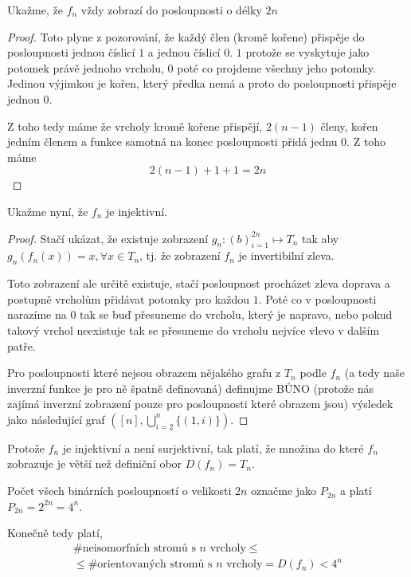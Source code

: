 \documentclass[../main.tex]{subfiles}
\begin{document}
Ukažme, že $f_n$ vždy zobrazí do posloupnosti o délky $2n$
\begin{proof}
    Toto plyne z pozorování, že každý člen (kromě kořene) přispěje do posloupnosti 
    jednou číslicí $1$ a jednou číslicí $0$. $1$ protože se vyskytuje jako potomek právě jednoho vrcholu, $0$ poté co projdeme všechny jeho potomky. 
    Jedinou výjimkou je kořen, který předka nemá a proto do posloupnosti přispěje jednou $0$.

    Z toho tedy máme že vrcholy kromě kořene přispějí, $2(n-1)$ členy, kořen jedním členem a funkce samotná na konec posloupnosti přidá jednu 0. Z toho máme \begin{equation*}
        2(n-1) + 1 + 1 = 2n 
    \end{equation*}
\end{proof}

Ukažme nyní, že $f_n$ je injektivní.

\begin{proof}
    Stačí ukázat, že existuje zobrazení $g_n: (b)_{i=1}^{2n} \mapsto T_n$ tak aby $g_n(f_n(x)) = x, \forall x \in T_n$, tj. že zobrazení $f_n$ je invertibilní zleva.

    Toto zobrazení ale určitě existuje, stačí posloupnost procházet zleva doprava a postupně vrcholům přidávat potomky 
    pro každou $1$. Poté co v posloupnosti narazíme na $0$ tak se buď přesuneme do vrcholu, který je napravo, 
    nebo pokud takový vrchol neexistuje tak se přesuneme do vrcholu nejvíce vlevo v dalším patře.

    Pro posloupnosti které nejsou obrazem nějakého grafu z $T_n$ podle $f_n$ (a tedy naše inverzní funkce je pro ně špatně definovaná)
    definujme BŮNO 
    (protože nás zajímá inverzní zobrazení pouze pro posloupnosti které obrazem jsou) 
    výsledek jako následující graf $([n], \bigcup_{i=2}^n \{(1,i)\})$.
\end{proof}


Protože $f_n$ je injektivní a není surjektivní, tak platí, že množina do které $f_n$ zobrazuje je větší než definiční obor $D(f_n) = T_n$.

Počet všech binárních posloupností o velikosti $2n$ označme jako $P_{2n}$ a platí  $P_{2n} = 2^{2n} = 4^n$.


Konečně tedy platí,
\begin{multline*}
\# \text{neisomorfních stromů s }n\text{ vrcholy} \leq\\\leq \# \text{orientovaných stromů s }n\text{ vrcholy} = D(f_n) < 4^n
\end{multline*}
\end{document}

